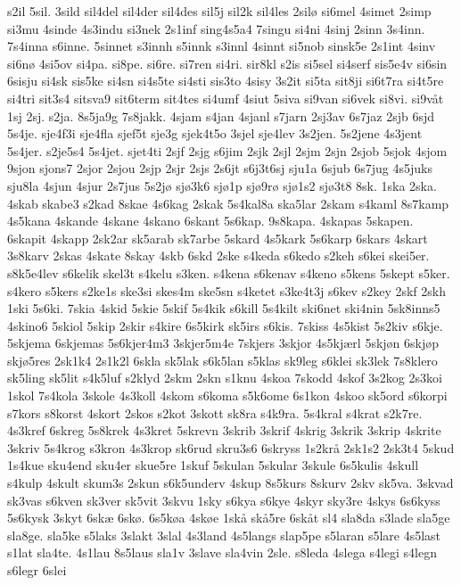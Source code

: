 {s2il
5sil.
3sild
sil4del
sil4der
sil4des
sil5j
sil2k
sil4les
2silø
si6mel
4simet
2simp
si3mu
4sinde
4s3indu
si3nek
2s1inf
sing4s5a4
7singu
si4ni
4sinj
2sinn
3s4inn.
7s4inna
s6inne.
5sinnet
s3innh
s5innk
s3innl
4sinnt
si5nob
sinsk5e
2s1int
4sinv
si6nø
4si5ov
si4pa.
si8pe.
si6re.
si7ren
si4ri.
sir8kl
s2is
si5sel
si4serf
sis5e4v
si6sin
6sisju
si4sk
sis5ke
si4sn
si4s5te
si4sti
sis3to
4sisy
3s2it
si5ta
sit8ji
si6t7ra
si4t5re
si4tri
sit3s4
sitsva9
sit6term
sit4tes
si4umf
4siut
5siva
si9van
si6vek
si8vi.
si9våt
1sj
2sj.
s2ja.
8s5ja9g
7s8jakk.
4sjam
s4jan
4sjanl
s7jarn
2sj3av
6s7jaz
2sjb
6sjd
5s4je.
sje4f3i
sje4fla
sjef5t
sje3g
sjek4t5o
3sjel
sje4lev
3s2jen.
5s2jene
4s3jent
5s4jer.
s2je5s4
5s4jet.
sjet4ti
2sjf
2sjg
s6jim
2sjk
2sjl
2sjm
2sjn
2sjob
5sjok
4sjom
9sjon
sjons7
2sjor
2sjou
2sjp
2sjr
2sjs
2s6jt
s6j3t6sj
sju1a
6sjub
6s7jug
4s5juks
sju8la
4sjun
4sjur
2s7jus
5s2jø
sjø3k6
sjø1p
sjø9rø
sjø1s2
sjø3t8
8sk.
1ska
2ska.
4skab
skabe3
s2kad
8skae
4s6kag
2skak
5s4kal8a
ska5lar
2skam
s4kaml
8s7kamp
4s5kana
4skande
4skane
4skano
6skant
5s6kap.
9s8kapa.
4skapas
5skapen.
6skapit
4skapp
2sk2ar
sk5arab
sk7arbe
5skard
4s5kark
5s6karp
6skars
4skart
3s8karv
2skas
4skate
8skay
4skb
6skd
2ske
s4keda
s6kedo
s2keh
s6kei
skei5er.
s8k5e4lev
s6kelik
skel3t
s4kelu
s3ken.
s4kena
s6kenav
s4keno
s5kens
5skept
s5ker.
s4kero
s5kers
s2ke1s
ske3si
skes4m
ske5sn
s4ketet
s3ke4t3j
s6kev
s2key
2skf
2skh
1ski
5s6ki.
7skia
4skid
5skie
5skif
5s4kik
s6kill
5s4kilt
ski6net
ski4nin
5sk8inns5
4skino6
5skiol
5skip
2skir
s4kire
6s5kirk
sk5irs
s6kis.
7skiss
4s5kist
5s2kiv
s6kje.
5skjema
6skjemas
5s6kjer4m3
3skjer5m4e
7skjers
3skjor
4s5kjærl
5skjøn
6skjøp
skjø5res
2sk1k4
2s1k2l
6skla
sk5lak
s6k5lan
s5klas
sk9leg
s6klei
sk3lek
7s8klero
sk5ling
sk5lit
s4k5luf
s2klyd
2skm
2skn
s1knu
4skoa
7skodd
4skof
3s2kog
2s3koi
1skol
7s4kola
3skole
4s3koll
4skom
s6koma
s5k6ome
6s1kon
4skoo
sk5ord
s6korpi
s7kors
s8korst
4skort
2skos
s2kot
3skott
sk8ra
s4k9ra.
5s4kral
s4krat
s2k7re.
4s3kref
6skreg
5s8krek
4s3kret
5skrevn
3skrib
3skrif
4skrig
3skrik
3skrip
4skrite
3skriv
5s4krog
s3kron
4s3krop
sk6rud
skru3s6
6skryss
1s2krå
2sk1s2
2sk3t4
5skud
1s4kue
sku4end
sku4er
skue5re
1skuf
5skulan
5skular
3skule
6s5kulis
4skull
s4kulp
4skult
skum3s
2skun
s6k5underv
4skup
8s5kurs
8skurv
2skv
sk5va.
3skvad
sk3vas
s6kven
sk3ver
sk5vit
3skvu
1sky
s6kya
s6kye
4skyr
sky3re
4skys
6s6kyss
5s6kysk
3skyt
6skæ
6skø.
6s5køa
4skøe
1skå
skå5re
6skåt
sl4
sla8da
s3lade
sla5ge
sla8ge.
sla5ke
s5laks
3slakt
3slal
4s3land
4s5langs
slap5pe
s5laran
s5lare
4s5last
s1lat
sla4te.
4s1lau
8s5laus
sla1v
3slave
sla4vin
2sle.
s8leda
4slega
s4legi
s4legn
s6legr
6slei
}
